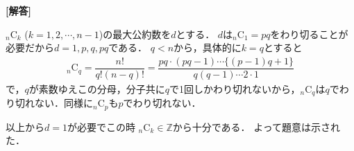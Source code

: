 \documentclass[../../main.tex]{subfiles}
\begin{document}
\begin{oframed}
  
\end{oframed}

{\bf [解答]}

${}_n \mathrm{C}_k$ ($k=1,2,\cdots, n-1$)の最大公約数を$d$とする．
$d$は${}_n \mathrm{C}_1 = pq$をわり切ることが必要だから$d=1,p,q,pq$である．
$q < n$から，具体的に$k=q$とすると
\begin{align}
  {}_n \mathrm{C}_q
  = \dfrac{n!}{q!(n-q)!}
  = \dfrac{pq \cdot (pq-1) \cdots \{ (p-1)q + 1 \}}{q (q-1) \cdots 2 \cdot 1}
\end{align}
で，$q$が素数ゆえこの分母，分子共に$q$で1回しかわり切れないから，${}_n \mathrm{C}_q$は$q$でわり切れない．同様に${}_n \mathrm{C}_p$も$p$でわり切れない．

以上から$d=1$が必要でこの時 ${}_n \mathrm{C}_k \in \mathbb{Z}$から十分である．
よって題意は示された．
\end{document}
